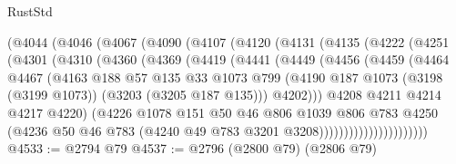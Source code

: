 \begin{lexlean}{RustStd}
\begin{coremodule}
{\begin{coremodule}
{{{{{{{{{{{{{{{        (@4044
          (@4046
            (@4067
              (@4090
                (@4107
                  (@4120
                    (@4131
                      (@4135
                        (@4222
                          (@4251
                            (@4301
                              (@4310
                                (@4360
                                  (@4369
                                    (@4419
                                      (@4441
                                        (@4449
                                          (@4456
                                            (@4459
                                              (@4464
                                                @4467
                                                (@4163
                                                  @188
                                                  @57
                                                  @135
                                                  @33
                                                  @1073
                                                  @799
                                                  (@4190
                                                    @187
                                                    @1073
                                                    (@3198 (@3199 @1073))
                                                    (@3203 (@3205 @187 @135)))
                                                  @4202)))
                                            @4208
                                            @4211
                                            @4214
                                            @4217
                                            @4220)
                                          (@4226
                                            @1078
                                            @151
                                            @50
                                            @46
                                            @806
                                            @1039
                                            @806
                                            @783
                                            @4250
                                            (@4236
                                              @50
                                              @46
                                              @783
                                              (@4240 @49 @783 @3201 @3208))))))))))))))))))))))
@4533 := @2794 @79
@4537 := @2796 (@2800 @79) (@2806 @79)
}}}}}}}}}}}}}}}
\end{coremodule}}
\end{coremodule}
\end{lexlean}
